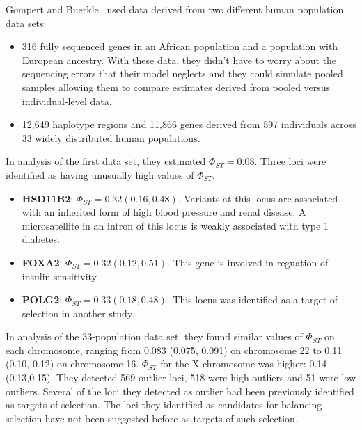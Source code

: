 Gompert and Buerkle~\cite{Gompert-Buerkle-2011} used data derived from
two different human population data sets:

\begin{itemize}

\item 316 fully sequenced genes in an African population and a
  population with European ancestry. With these data, they didn't have
  to worry about the sequencing errors that their model neglects and
  they could simulate pooled samples allowing them to compare
  estimates derived from pooled versus individual-level data.

\item 12,649 haplotype regions and 11,866 genes derived from 597
  individuals across 33 widely distributed human populations.

\end{itemize}

In analysis of the first data set, they estimated
$\Phi_{ST}=0.08$. Three loci were identified as having unusually high
values of $\Phi_{ST}$. 

\begin{itemize}

\item {\bf HSD11B2}: $\Phi_{ST}=0.32 (0.16,0.48)$. Variants at this
  locus are associated with an inherited form of high blood pressure
  and renal disease. A microsatellite in an intron of this locus is
  weakly associated with type 1 diabetes.

\item {\bf FOXA2}: $\Phi_{ST}=0.32 (0.12,0.51)$. This gene is involved
  in reguation of insulin sensitivity.

\item {\bf POLG2}: $\Phi_{ST}=0.33 (0.18,0.48)$. This locus was
  identified as a target of selection in another study.

\end{itemize}

In analysis of the 33-population data set, they found similar values
of $\Phi_{ST}$ on each chromosome, ranging from 0.083 (0.075, 0.091)
on chromosome 22 to 0.11 (0.10, 0.12) on chromosome 16. $\Phi_{ST}$
for the X chromosome was higher: 0.14 (0.13,0.15). They detected 569
outlier loci, 518 were high outliers and 51 were low outliers. Several
of the loci they detected as outlier had been previously identified as
targets of selection. The loci they identified as candidates for
balancing selection have not been suggested before as targets of such
selection.  

